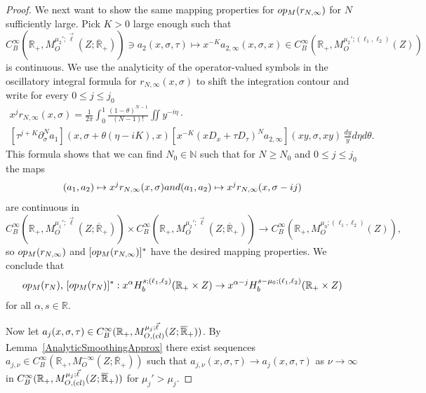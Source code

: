\documentclass[10pt,a4paper]{amsart}
\def\N{\mathbb N}
\def\R{\mathbb R}
\def\opm{\textup{op}_{\textit{M}}}
\begin{document}
\begin{proof}
We next want to show the same mapping properties for $\opm(r_{N,\infty})$ for $N$ sufficiently large. Pick $K > 0$ large enough such that
$$
C^{\infty}_B(\R_+,M^{\mu_2';\vec{\ell}}_{O}(Z;\overline{\R}_+)) \!\ni\! a_2(x,\sigma,\tau) \mapsto x^{-K}a_{2,\infty}(x,\sigma,x) \!\in\! C^{\infty}_B(\R_+,M^{\mu_2';(\ell_1,\ell_2)}_{O}(Z))
$$
is continuous. We use the analyticity of the operator-valued symbols in the oscillatory integral formula for $r_{N,\infty}(x,\sigma)$ to shift the integration contour and write for every $0 \leq j \leq j_0$
\begin{gather*}
x^jr_{N,\infty}(x,\sigma) = \frac{1}{2\pi}\! \int_0^1\!\frac{(1-\theta)^{N-1}}{(N-1)!} \iint y^{-i\eta} \cdot \\
[\tau^{j+K}\partial_{\sigma}^Na_1](x,\sigma+\theta(\eta-iK),x)[x^{-K}(xD_{x}+\tau D_{\tau})^Na_{2,\infty}](xy,\sigma,xy)\,\frac{dy}{y}d\eta d\theta.
\end{gather*}
This formula shows that we can find $N_0 \in \N$ such that for $N \geq N_0$ and $0 \leq j \leq j_0$ the maps
$$
(a_1,a_2) \mapsto x^jr_{N,\infty}(x,\sigma) \textup{ and } (a_1,a_2) \mapsto x^jr_{N,\infty}(x,\sigma-ij)
$$
are continuous in
$$
C^{\infty}_B(\R_+,M^{\mu_1';\vec{\ell}}_{O}(Z;\overline{\R}_+)) \times C^{\infty}_B(\R_+,M^{\mu_2';\vec{\ell}}_{O}(Z;\overline{\R}_+)) \to C^{\infty}_B(\R_+,M^{\mu_0;(\ell_1,\ell_2)}_{O}(Z)),
$$
so $\opm(r_{N,\infty})$ and $[\opm(r_{N,\infty})]^*$ have the desired mapping properties. We conclude that
$$
\opm(r_{N}),\, [\opm(r_{N})]^* : x^{\alpha}H^{s;(\ell_1,\ell_2)}_b(\R_+\times Z) \to x^{\alpha-j}H^{s-\mu_0;(\ell_1,\ell_2)}_b(\R_+\times Z)
$$
for all $\alpha,s \in \R$.

Now let $a_j(x,\sigma,\tau) \in C^{\infty}_B(\R_+,M^{\mu_j;\vec{\ell}}_{O,\textup{(cl)}}(Z;\overline{\R}_+))$. By Lemma~\ref{AnalyticSmoothingApprox} there exist sequences $a_{j,\nu} \in C^{\infty}_B(\R_+,M^{-\infty}_{O}(Z;\overline{\R}_+))$ such that $a_{j,\nu}(x,\sigma,\tau) \to a_j(x,\sigma,\tau)$ as $\nu \to \infty$ in $C^{\infty}_B(\R_+,M^{\mu_j;\vec{\ell}}_{O,\textup{(cl)}}(Z;\overline{\R}_+))$ for $\mu_j' > \mu_j$.


\end{proof}
\end{document}
